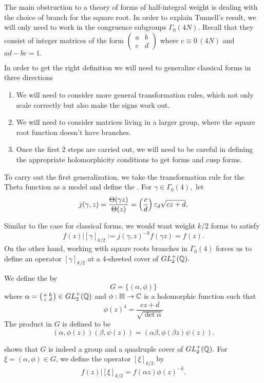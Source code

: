 \documentclass[12pt, a4paper]{report}
\begin{document}
The main obstruction to a theory of forms of half-integral weight is dealing
with the choice of branch for the square root. In order to explain Tunnell's
result, we will only need to work in the congruence subgroups $\Gamma_0(4N)$.
Recall that they consist of integer matrices of the form $
\left( \begin{smallmatrix}
  a & b \\ c & d
\end{smallmatrix} \right)
$ where $c \equiv 0 \, (4N)$ and $ad - bc = 1.$

In order to get the right definition we will need to generalize classical forms
in three directions
\begin{enumerate}
\item We will need to consider more general transformation rules, which not only
  scale correctly but also make the signs work out.
\item We will need to consider matrices living in a larger group, where the
  square root function doesn't have branches.
\item Once the first 2 steps are carried out, we will need to be careful in
  defining the appropriate holomorphicity conditions to get forms and cusp forms.
\end{enumerate}

\begin{defn} \label{automorphy}
  To carry out the first generalization, we take the transformation rule for the
  Theta function as a model and define the . For
  $\gamma \in \Gamma_0(4),$ let
  \[j(\gamma, z) = \frac{\Theta(\gamma z)}{\Theta(z)} = \left(\frac{c}{d}\right)
    \varepsilon_d \sqrt{cz + d}.\]
\end{defn}

Similar to the case for classical forms, we would want weight $k/2$ forms to
satisfy
\[f(z)|[\gamma]_{k/2} := j(\gamma,z)^{-k}f(\gamma z) = f(z).\]
On the other hand, working with square roots branches in $\Gamma_0(4)$ forces us to
define an operator $[\gamma]_{k/2}$ at a 4-sheeted cover of $GL_2^+({\mathbb Q}).$

\begin{defn}
  We define the  by
  \[G = \{(\alpha, \phi )\}\]
  where $\alpha = \left(
    \begin{smallmatrix}
      a & b \\ c & d
    \end{smallmatrix}
\right) \in GL_2^+({\mathbb Q})$ and $\phi : \mathbb{H} \rightarrow {\mathbb C}$ is a holomorphic function such
that
\[\phi(z)^4 = \frac{cz+d}{\sqrt{\det \alpha}}\]
The product in $G$ is defined to be
\[(\alpha, \phi(z))(\beta, \psi(z)) = (\alpha \beta, \phi(\beta z) \psi(z)).\]
\end{defn}
\cite[Pages 179-180]{koblitz} shows that $G$ is indeed a group and a quadruple cover of 
$GL_2^+({\mathbb Q}).$
For $\xi = (\alpha, \phi) \in G$, we define the operator $[\xi]_{k/2}$ by
\[f(z) | [\xi]_{k/2} = f(\alpha z)\phi(z)^{-k}.\]
\end{document}

